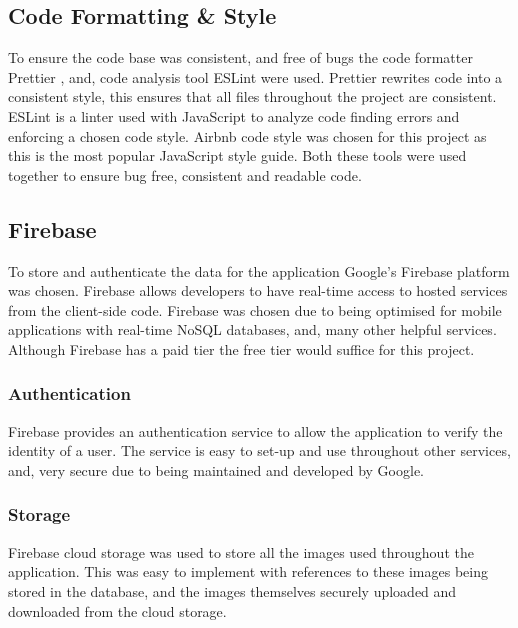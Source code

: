 \subsection{Code Formatting \& Style} \label{CodeF&S}
To ensure the code base was consistent, and free of bugs the code formatter Prettier \cite{prettier}, and, code analysis tool ESLint \cite{eslint} were used. Prettier rewrites code into a consistent style, this ensures that all files throughout the project are consistent. ESLint is a linter used with JavaScript to analyze code finding errors and enforcing a chosen code style. Airbnb \cite{airbnb} code style was chosen for this project as this is the most popular JavaScript style guide. Both these tools were used together to ensure bug free, consistent and readable code. 
\subsection{Firebase}\label{firebaseSection}
To store and authenticate the data for the application Google's Firebase \cite{firebase} platform was chosen. Firebase allows developers to have real-time access to hosted services from the client-side code. Firebase was chosen due to being optimised for mobile applications with real-time NoSQL \cite{nosql} databases, and, many other helpful services. Although Firebase has a paid tier the free tier would suffice for this project.     
\subsubsection{Authentication}
Firebase provides an authentication service to allow the application to verify the identity of a user. The service is easy to set-up and use throughout other services, and, very secure due to being maintained and developed by Google.
\subsubsection{Storage}
Firebase cloud storage was used to store all the images used throughout the application. This was easy to implement with references to these images being stored in the database, and the images themselves securely uploaded and downloaded from the cloud storage.
